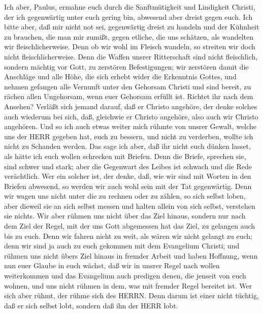  Ich aber, Paulus, ermahne euch durch die Sanftmütigkeit und
Lindigkeit Christi, der ich gegenwärtig unter euch gering bin, abwesend
aber dreist gegen euch.  Ich bitte aber, daß mir nicht not
sei, gegenwärtig dreist zu handeln und der Kühnheit zu brauchen, die man
mir zumißt, gegen etliche, die uns schätzen, als wandelten wir
fleischlicherweise.  Denn ob wir wohl im Fleisch wandeln, so
streiten wir doch nicht fleischlicherweise.  Denn die Waffen
unsrer Ritterschaft sind nicht fleischlich, sondern mächtig vor Gott, zu
zerstören Befestigungen;  wir zerstören damit die Anschläge
und alle Höhe, die sich erhebt wider die Erkenntnis Gottes, und nehmen
gefangen alle Vernunft unter den Gehorsam Christi  und sind
bereit, zu rächen allen Ungehorsam, wenn euer Gehorsam erfüllt ist.
 Richtet ihr nach dem Ansehen? Verläßt sich jemand darauf,
daß er Christo angehöre, der denke solches auch wiederum bei sich, daß,
gleichwie er Christo angehöre, also auch wir Christo angehören.
 Und so ich auch etwas weiter mich rühmte von unsrer Gewalt,
welche uns der HERR gegeben hat, euch zu bessern, und nicht zu
verderben, wollte ich nicht zu Schanden werden.  Das sage
ich aber, daß ihr nicht euch dünken lasset, als hätte ich euch wollen
schrecken mit Briefen.  Denn die Briefe, sprechen sie, sind
schwer und stark; aber die Gegenwart des Leibes ist schwach und die Rede
verächtlich.  Wer ein solcher ist, der denke, daß, wie wir
sind mit Worten in den Briefen abwesend, so werden wir auch wohl sein
mit der Tat gegenwärtig.  Denn wir wagen uns nicht unter
die zu rechnen oder zu zählen, so sich selbst loben, aber dieweil sie an
sich selbst messen und halten allein von sich selbst, verstehen sie
nichts.  Wir aber rühmen uns nicht über das Ziel hinaus,
sondern nur nach dem Ziel der Regel, mit der uns Gott abgemessen hat das
Ziel, zu gelangen auch bis zu euch.  Denn wir fahren nicht
zu weit, als wären wir nicht gelangt zu euch; denn wir sind ja auch zu
euch gekommen mit dem Evangelium Christi;  und rühmen uns
nicht übers Ziel hinaus in fremder Arbeit und haben Hoffnung, wenn nun
euer Glaube in euch wächst, daß wir in unsrer Regel nach wollen
weiterkommen  und das Evangelium auch predigen denen, die
jenseit von euch wohnen, und uns nicht rühmen in dem, was mit fremder
Regel bereitet ist.  Wer sich aber rühmt, der rühme sich
des HERRN.  Denn darum ist einer nicht tüchtig, daß er sich
selbst lobt, sondern daß ihn der HERR lobt.

